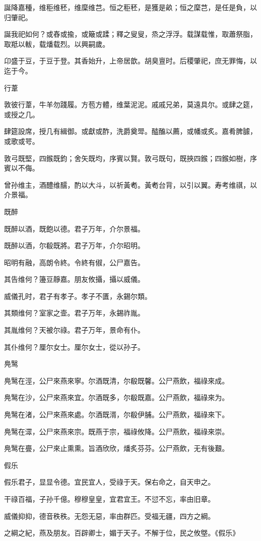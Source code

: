 誕降嘉種，维秬维秠，维穈维芑。恒之秬秠，是獲是畝；恒之穈芑，是任是負，以归肇祀。

誕我祀如何？或舂或揄，或簸或蹂；釋之叟叟，烝之浮浮。载謀载惟，取蕭祭脂，取羝以軷，载燔载烈。以興嗣歲。

卬盛于豆，于豆于登。其香始升，上帝居歆。胡臭亶时。后稷肇祀，庶无罪悔，以迄于今。

行葦

敦彼行葦，牛羊勿踐履。方苞方體，维葉泥泥。戚戚兄弟，莫遠具尔。或肆之筵，或授之几。

肆筵設席，授几有緝御。或獻或酢，洗爵奠斝。醓醢以薦，或幡或炙。嘉肴脾臄，或歌或咢。

敦弓既堅，四鍭既鈞；舍矢既均，序賓以賢。敦弓既句，既挾四鍭；四鍭如樹，序賓以不侮。

曾孙维主，酒醴维醹，酌以大斗，以祈黃耇。黃耇台背，以引以翼。寿考维祺，以介景福。

既醉

既醉以酒，既飽以德。君子万年，介尔景福。

既醉以酒，尔殽既將。君子万年，介尔昭明。

昭明有融，高朗令終。令終有俶，公尸嘉告。

其告维何？籩豆靜嘉。朋友攸攝，攝以威儀。

威儀孔时，君子有孝子。孝子不匱，永錫尔類。

其類维何？室家之壸。君子万年，永錫祚胤。

其胤维何？天被尔祿。君子万年，景命有仆。

其仆维何？厘尔女士。厘尔女士，從以孙子。

鳧鹥

鳧鹥在涇，公尸來燕來寧。尔酒既清，尔殽既馨。公尸燕飲，福祿來成。

鳧鹥在沙，公尸來燕來宜。尔酒既多，尔殽既嘉。公尸燕飲，福祿來为。

鳧鹥在渚，公尸來燕來處。尔酒既湑，尔殽伊脯。公尸燕飲，福祿來下。

鳧鹥在潀，公尸來燕來宗。既燕于宗，福祿攸降。公尸燕飲，福祿來崇。

鳧鹥在亹，公尸來止熏熏。旨酒欣欣，燔炙芬芬。公尸燕飲，无有後艱。

假乐

假乐君子，显显令德。宜民宜人，受祿于天。保右命之，自天申之。

干祿百福，子孙千億。穆穆皇皇，宜君宜王。不愆不忘，率由旧章。

威儀抑抑，德音秩秩。无怨无惡，率由群匹。受福无疆，四方之綱。

之綱之紀，燕及朋友。百辟卿士，媚于天子。不解于位，民之攸墍。《假乐》

